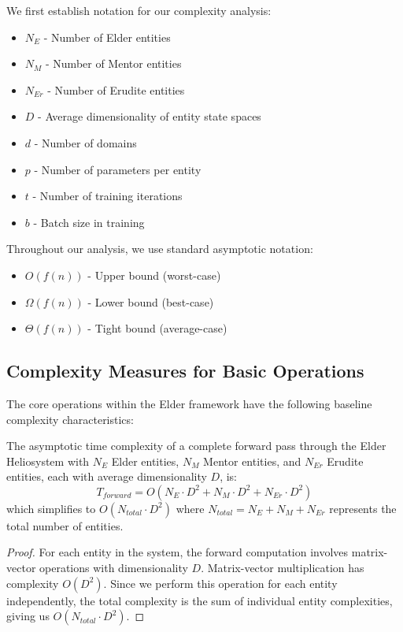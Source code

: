 We first establish notation for our complexity analysis:

\begin{itemize}
    \item $N_E$ - Number of Elder entities
    \item $N_M$ - Number of Mentor entities
    \item $N_{Er}$ - Number of Erudite entities
    \item $D$ - Average dimensionality of entity state spaces
    \item $d$ - Number of domains
    \item $p$ - Number of parameters per entity
    \item $t$ - Number of training iterations
    \item $b$ - Batch size in training
\end{itemize}

Throughout our analysis, we use standard asymptotic notation:
\begin{itemize}
    \item $O(f(n))$ - Upper bound (worst-case)
    \item $\Omega(f(n))$ - Lower bound (best-case)
    \item $\Theta(f(n))$ - Tight bound (average-case)
\end{itemize}

\subsection{Complexity Measures for Basic Operations}

The core operations within the Elder framework have the following baseline complexity characteristics:

\begin{theorem}
The asymptotic time complexity of a complete forward pass through the Elder Heliosystem with $N_E$ Elder entities, $N_M$ Mentor entities, and $N_{Er}$ Erudite entities, each with average dimensionality $D$, is:
\begin{equation}
T_{forward} = O(N_E \cdot D^2 + N_M \cdot D^2 + N_{Er} \cdot D^2)
\end{equation}
which simplifies to $O(N_{total} \cdot D^2)$ where $N_{total} = N_E + N_M + N_{Er}$ represents the total number of entities.
\end{theorem}

\begin{proof}
For each entity in the system, the forward computation involves matrix-vector operations with dimensionality $D$. Matrix-vector multiplication has complexity $O(D^2)$. Since we perform this operation for each entity independently, the total complexity is the sum of individual entity complexities, giving us $O(N_{total} \cdot D^2)$.
\end{proof}

